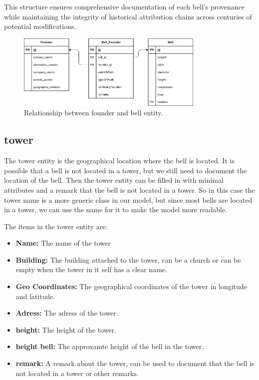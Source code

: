 \documentclass[11pt, a4paper]{article}
\begin{document}
This structure ensures comprehensive documentation of each bell's provenance while maintaining the integrity of historical attribution chains across centuries of potential modifications.

\begin{figure}[h!]
    \centering
    \includegraphics[width=0.8\textwidth]{images/founder_bell.png}
    \caption{Relationship between founder and bell entity.}
    \label{fig:founder_bell-relation}
\end{figure}


\subsection{tower}

The tower entity is the geographical location where the bell is located. It is possible that a bell is not located in a tower, but we still need to document the location of the bell. Then the tower entity can be filled in with minimal attributes and a remark that the bell is not located in a tower. So in this case the tower name is a more generic class in our model, but since most bells are located in a tower, we can use the name for it to make the model more readable.

The items in the tower entity are:

\begin{itemize}
    \item \textbf{Name:} The name of the tower
    \item \textbf{Building:} The building attached to the tower, can be a church or can be empty when the tower in it self has a clear name.
    \item \textbf{Geo Coordinates:} The geographical coordinates of the tower in longitude and latitude.
    \item \textbf{Adress:} The adress of the tower.
    \item \textbf{height:} The height of the tower.
    \item \textbf{height bell:} The approxamte height of the bell in the tower.
    \item \textbf{remark:} A remark about the tower, can be used to document that the bell is not located in a tower or other remarks.
\end{itemize}
\end{document}
